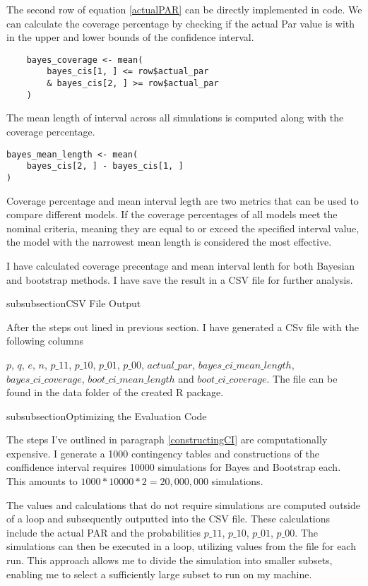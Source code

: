 The second row of equation \ref{actualPAR} can be directly implemented in code. We can calculate the coverage percentage by checking if the actual Par value is with in the upper and lower bounds of the confidence interval. 

\begin{lstlisting}
    bayes_coverage <- mean(
        bayes_cis[1, ] <= row$actual_par 
        & bayes_cis[2, ] >= row$actual_par
    )
\end{lstlisting}

The mean length of interval across all simulations is computed along with the coverage percentage.

\begin{lstlisting}
bayes_mean_length <- mean(
    bayes_cis[2, ] - bayes_cis[1, ]
)
\end{lstlisting}

Coverage percentage and mean interval legth are two metrics that can be used to compare different models. If the coverage percentages of all models meet the nominal criteria, meaning they are equal to or exceed the specified interval value, the model with the narrowest mean length is considered the most effective.

I have calculated coverage precentage and mean interval lenth for both Bayesian and bootstrap methods. I have save the result in a CSV file for further analysis.

\*subsubsection{CSV File Output}

After the steps out lined in previous section. I have generated a CSv file with the following columns

$p$, $q$, $e$, $n$, $p\_11$, $p\_10$, $p\_01$, $p\_00$, $actual\_par$, $bayes\_ci\_mean\_length$, $bayes\_ci\_coverage$, $boot\_ci\_mean\_length$ and $boot\_ci\_coverage$. The file can be found in the data folder of the created R package.

\*subsubsection{Optimizing the Evaluation Code}

The steps I've outlined in paragraph \ref{constructingCI} are computationally expensive. I generate a 1000 contingency tables and constructions of the conffidence interval requires 10000 simulations for Bayes and Bootstrap each. This amounts to $1000 * 10000 * 2 = 20,000,000$ simulations. 

The values and calculations that do not require simulations are computed outside of a loop and subsequently outputted into the CSV file. These calculations include the actual PAR and the probabilities $p\_11$, $p\_10$, $p\_01$, $p\_00$. The simulations can then be executed in a loop, utilizing values from the file for each run. This approach allows me to divide the simulation into smaller subsets, enabling me to select a sufficiently large subset to run on my machine.

